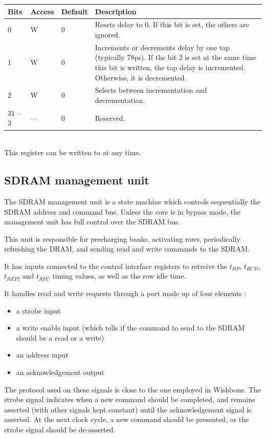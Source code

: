 \documentclass[a4paper,11pt]{article}
\begin{document}
\begin{tabular}{|p{1.5cm}|l|l|p{10cm}|}
\hline
\bf Bits & \bf Access & \bf Default & \bf Description \\
\hline
0 & W & 0 & Resets delay to 0. If this bit is set, the others are ignored. \\
\hline
1 & W & 0 & Increments or decrements delay by one tap (typically 78ps). If the bit 2 is set at the same time this bit is written, the tap delay is incremented. Otherwise, it is decremented. \\
\hline
2 & W & 0 & Selects between incrementation and decrementation. \\
\hline
31 -- 3 & --- & 0 & Reserved. \\
\hline
\end{tabular}\\

This register can be written to at any time.


\subsection{SDRAM management unit}
The SDRAM management unit is a state machine which controls sequentially the SDRAM address and command bus. Unless the core is in bypass mode, the management unit has full control over the SDRAM bus.

This unit is responsible for precharging banks, activating rows, periodically refreshing the DRAM, and sending read and write commands to the SDRAM.

It has inputs connected to the control interface registers to retreive the $t_{RP}$, $t_{RCD}$, $t_{REFI}$ and $t_{RFC}$ timing values, as well as the row idle time.

It handles read and write requests through a port made up of four elements :
\begin{itemize}
\item a strobe input
\item a write enable input (which tells if the command to send to the SDRAM should be a read or a write)
\item an address input
\item an acknowledgement output
\end{itemize}

The protocol used on these signals is close to the one employed in Wishbone. The strobe signal indicates when a new command should be completed, and remains asserted (with other signals kept constant) until the acknowledgement signal is asserted. At the next clock cycle, a new command should be presented, or the strobe signal should be de-asserted.
\end{document}
